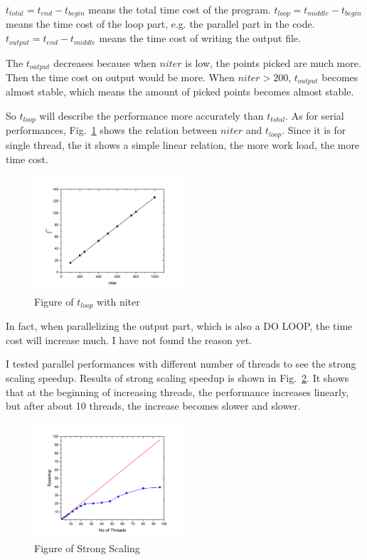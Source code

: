 \documentclass[letterpaper,10pt]{article}
\begin{document}
$t_{total}=t_{end}-t_{begin}$ means the total time cost of the program. $t_{loop}=t_{middle}-t_{begin}$ 
means the time cost of the loop part, e.g. the parallel part in the code. $t_{output}=t_{end}-t_{middle}$ 
means the time cost of writing the output file. 

The $t_{output}$ decreases because when $niter$ is low, the points picked are much more. Then the time cost 
on output would be more. When $niter > 200$, $t_{output}$ becomes almost stable, which means the amount of 
picked points becomes almost stable. 

So $t_{loop}$ will describe the performance more accurately than $t_{total}$. As for serial performances, 
Fig.~\ref{figFS} shows the relation between $niter$ and $t_{loop}$. Since it is for single thread, the it 
shows a simple linear relation, the more work load, the more time cost. 
\begin{figure}[h]
  \centering
  \includegraphics[width=0.5\textwidth]{figFS.png}
  \caption{Figure of $t_{loop}$ with niter}
  \label{figFS}
\end{figure}
In fact, when parallelizing the output part, which is also a DO LOOP, the time cost will increase much. 
I have not found the reason yet. 

I tested parallel performances with different number of threads to see the strong scaling speedup. 
Results of strong scaling speedup is shown in Fig.~\ref{figSS}. It shows that at the beginning of increasing 
threads, the performance increases linearly, but after about 10 threads, the increase becomes slower and slower. 
\begin{figure}[h]
  \centering
  \includegraphics[width=0.5\textwidth]{StrongS.png}
  \caption{Figure of Strong Scaling}
  \label{figSS}
\end{figure}
\end{document}
